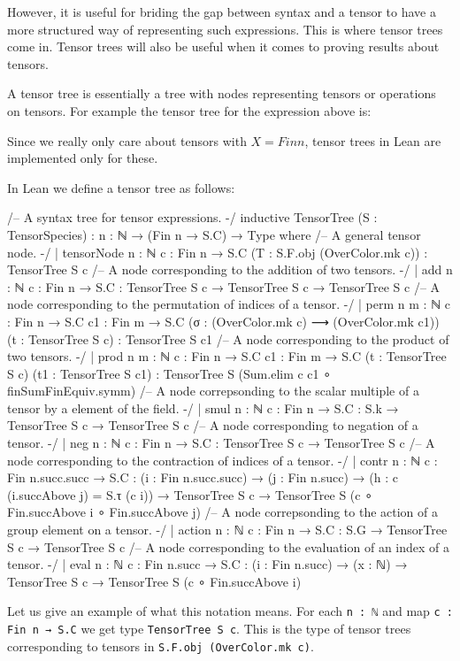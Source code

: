 \documentclass[a4paper, 11pt]{article}
\begin{document}
However, it is useful for briding the gap between syntax and a tensor to have a more structured way 
of representing such expressions.
This is where tensor trees come in. Tensor trees will also be useful when it comes to proving 
results about tensors. 

A tensor tree is essentially a tree with nodes representing tensors or operations on tensors.
For example the tensor tree for the expression above is: 

Since we really only care about tensors with $X = Fin n$, tensor trees in Lean are 
    implemented only for these. 

In Lean we define a tensor tree as follows: 
\begin{code}
/-- A syntax tree for tensor expressions. -/
inductive TensorTree (S : TensorSpecies) : {n : ℕ} → (Fin n → S.C) → Type where
  /-- A general tensor node. -/
  | tensorNode {n : ℕ} {c : Fin n → S.C} (T : S.F.obj (OverColor.mk c)) : TensorTree S c
  /-- A node corresponding to the addition of two tensors. -/
  | add {n : ℕ} {c : Fin n → S.C} : TensorTree S c → TensorTree S c → TensorTree S c
  /-- A node corresponding to the permutation of indices of a tensor. -/
  | perm {n m : ℕ} {c : Fin n → S.C} {c1 : Fin m → S.C}
      (σ : (OverColor.mk c) ⟶ (OverColor.mk c1)) (t : TensorTree S c) : TensorTree S c1
  /-- A node corresponding to the product of two tensors. -/
  | prod {n m : ℕ} {c : Fin n → S.C} {c1 : Fin m → S.C}
    (t : TensorTree S c) (t1 : TensorTree S c1) : TensorTree S (Sum.elim c c1 ∘ finSumFinEquiv.symm)
  /-- A node correpsonding to the scalar multiple of a tensor by a element of the field. -/
  | smul {n : ℕ} {c : Fin n → S.C} : S.k → TensorTree S c → TensorTree S c
  /-- A node corresponding to negation of a tensor. -/
  | neg {n : ℕ} {c : Fin n → S.C} : TensorTree S c → TensorTree S c
  /-- A node corresponding to the contraction of indices of a tensor. -/
  | contr {n : ℕ} {c : Fin n.succ.succ → S.C} : (i : Fin n.succ.succ) →
    (j : Fin n.succ) → (h : c (i.succAbove j) = S.τ (c i)) → TensorTree S c →
    TensorTree S (c ∘ Fin.succAbove i ∘ Fin.succAbove j)
  /-- A node correpsonding to the action of a group element on a tensor. -/
  | action {n : ℕ} {c : Fin n → S.C} : S.G → TensorTree S c → TensorTree S c
  /-- A node corresponding to the evaluation of an index of a tensor. -/
  | eval {n : ℕ} {c : Fin n.succ → S.C} : (i : Fin n.succ) → (x : ℕ) → TensorTree S c →
    TensorTree S (c ∘ Fin.succAbove i)
\end{code}
Let us give an example of what this notation means. For each \lstinline|n : ℕ| and map 
\lstinline|c : Fin n → S.C| we get type \lstinline|TensorTree S c|. This is the type of
tensor trees corresponding to tensors in \lstinline|S.F.obj (OverColor.mk c)|.
\end{document}
